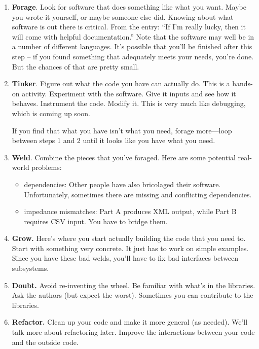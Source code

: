 \begin{enumerate}
\item {\bf Forage}. Look for software that does something like what
  you want. Maybe you wrote it yourself, or maybe someone else did.
  Knowing about what software is out there is critical.  From the
  entry: ``If I'm really lucky, then it will come with helpful
  documentation.'' Note that the software may well be in a number
  of different languages. It's possible that you'll be finished after
  this step -- if you found something that adequately meets your needs,
  you're done. But the chances of that are pretty small.
  
\item {\bf Tinker}. Figure out what the code you have can actually do. This is a
hands-on activity. Experiment with the software. Give it inputs and see
how it behaves. Instrument the code. Modify it. This is very much like
debugging, which is coming up soon.

If you find that what you have isn't what you need, forage more---loop
between steps 1 and 2 until it looks like you have what you need.

\item {\bf Weld}. Combine the pieces that you've foraged. Here are some
potential real-world problems:

\begin{itemize}
\item dependencies: Other people have also bricolaged their software.
Unfortunately, sometimes there are missing and conflicting dependencies.
\item impedance mismatches: Part A produces XML output, while Part B requires
CSV input. You have to bridge them.
\end{itemize}

\item {\bf Grow.} Here's where you start actually building the code
  that you need to. Start with something very concrete. It just has to
  work on simple examples.  Since you have these bad welds, you'll
  have to fix bad interfaces between subsystems.

\item {\bf Doubt.} Avoid re-inventing the wheel. Be familiar with what's
in the libraries. Ask the authors (but expect the worst). Sometimes you can
contribute to the libraries.

\item {\bf Refactor.} Clean up your code and make it more general (as needed).
We'll talk more about refactoring later. Improve the interactions between
your code and the outside code.
\end{enumerate}

